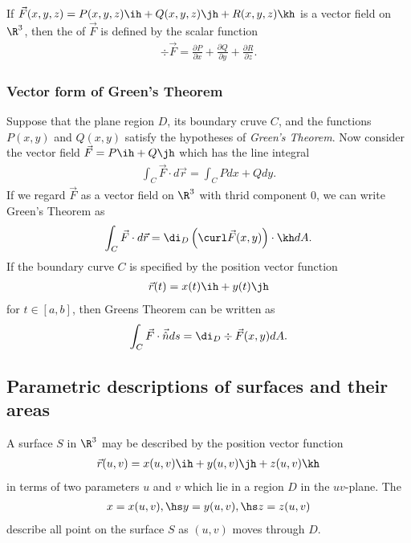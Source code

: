 \documentclass{article}
\begin{document}
\begin{definition}
    If $\vec F(x,y,z)=P(x,y,z)\ih + Q(x,y,z)\jh + R(x,y,z)\kh$ is a vector field on $\R^3$, then
    the  of $\vec F$ is defined by the scalar function
    \begin{align*}
        \div \vec F = \frac{\partial P}{\partial x}+\frac{\partial Q}{\partial y} + \frac{\partial R}{\partial z}.
    \end{align*}
\end{definition}

\subsubsection{Vector form of Green's Theorem}

\begin{theorem}
    Suppose that the plane region $D$, its boundary cruve $C$, and the functions
    $P(x,y)$ and $Q(x,y)$ satisfy the hypotheses of \emph{Green's Theorem}. Now
    consider the vector field $\vec F = P\ih + Q\jh$ which has the line integral
    \begin{align*}
        \int_C\vec F \cdot d\vec r = \int_C Pdx + Qdy.
    \end{align*}
    If we regard $\vec F$ as a vector field on $\R^3$ with thrid component $0$, 
    we can write Green's Theorem as
    \begin{align*}
        \int_C\vec F \cdot d\vec r = \di_D\left(\curl\vec F(x,y)\right)\cdot\kh dA.
    \end{align*}
    If the boundary curve $C$ is specified by the position vector function
    \begin{align*}
        \vec r(t) = x(t)\ih + y(t)\jh
    \end{align*}
    for $t\in[a,b]$, then Greens Theorem can be written as
    \begin{align*}
        \int_C \vec F\cdot \vec{\hat n} ds = \di_D \div\vec F(x,y)dA.
    \end{align*}
\end{theorem}


\subsection{Parametric descriptions of surfaces and their areas}


\begin{definition}
    A surface $S$ in $\R^3$ may be described by the position vector function
    \begin{align*}
        \vec r(u,v) = x(u,v)\ih + y(u,v)\jh + z(u,v)\kh
    \end{align*}
    in terms of two parameters $u$ and $v$ which lie in a region $D$ in the $uv$-plane.
    The 
    \begin{align*}
        x = x(u,v),\hs y=y(u,v),\hs z=z(u,v)
    \end{align*}
    describe all point on the surface $S$ as $(u,v)$ moves through $D$.
\end{definition}
\end{document}
